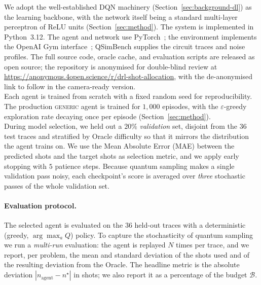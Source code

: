 \documentclass[runningheads]{llncs}
\begin{document}
We adopt the well-established DQN machinery (Section~\ref{sec:background-dl}) as
the learning backbone, with the network itself being a standard multi-layer
perceptron of ReLU units (Section~\ref{sec:method}).
The system is implemented in Python~3.12. The agent
and network use PyTorch~\cite{paszke2019pytorch}; the environment implements the
OpenAI Gym interface~\cite{brockman2016gym}; QSimBench supplies the circuit
traces and noise profiles. The full source code, oracle cache, and evaluation
scripts are released as open source; the repository is anonymised for
double-blind review at
\url{https://anonymous.4open.science/r/drl-shot-allocation}, with the
de-anonymised link to follow in the camera-ready version.\\
Each agent is trained from scratch with a fixed
random seed for reproducibility. The production \textsc{generic} agent is
trained for $1{,}000$ episodes, with the $\varepsilon$-greedy exploration rate
decaying once per episode (Section~\ref{sec:method}).\\
During model selection, we held out a
$20\%$ \emph{validation} set, disjoint from the 36
test traces and stratified by Oracle difficulty so that it mirrors the
distribution the agent trains on. We use the Mean Absolute Error (MAE) between the predicted shots and the target shots as selection metric, and we apply early stopping with $5$ patience steps.
Because quantum
sampling makes a single validation pass noisy, each checkpoint's score is
averaged over \emph{three} stochastic passes of the whole validation set. 
\paragraph{Evaluation protocol.} The selected agent is evaluated on the 36
held-out traces with a deterministic (greedy, $\arg\max_a Q$) policy. To capture
the stochasticity of quantum sampling we run a \emph{multi-run} evaluation: the
agent is replayed $N$ times per trace, and we report, per problem, the mean and
standard deviation of the shots used and of the resulting deviation from the
Oracle. The headline metric is the absolute deviation
$|n_{\text{agent}}-n^{\star}|$ in shots; we also report it as a percentage of the
budget $\mathcal{B}$.
\end{document}
